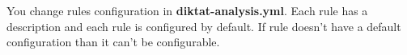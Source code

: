 You change rules configuration in \textbf{diktat-analysis.yml}. Each rule has a description and each rule is configured by default. If rule doesn't have a default configuration than it can't be configurable.